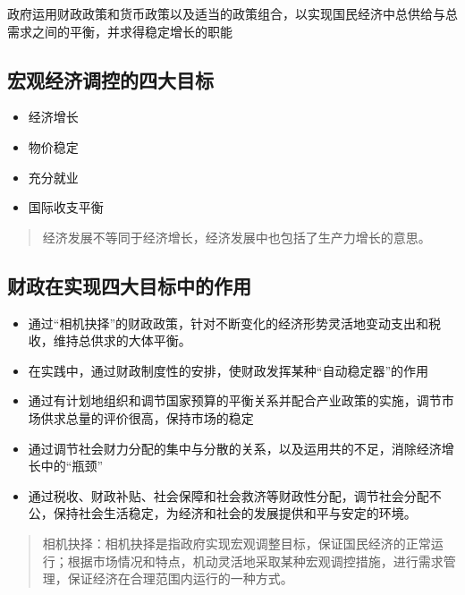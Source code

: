 \documentclass[
]{book}
\providecommand{\tightlist}{%
  \setlength{\itemsep}{0pt}\setlength{\parskip}{0pt}}
\theoremstyle{definition}
\theoremstyle{definition}
\theoremstyle{definition}
\theoremstyle{definition}
\theoremstyle{remark}
\begin{document}
政府运用财政政策和货币政策以及适当的政策组合，以实现国民经济中总供给与总需求之间的平衡，并求得稳定增长的职能

\hypertarget{ux5b8fux89c2ux7ecfux6d4eux8c03ux63a7ux7684ux56dbux5927ux76eeux6807}{%
\subsection{宏观经济调控的四大目标}\label{ux5b8fux89c2ux7ecfux6d4eux8c03ux63a7ux7684ux56dbux5927ux76eeux6807}}

\begin{itemize}
\tightlist
\item
  经济增长
\item
  物价稳定
\item
  充分就业
\item
  国际收支平衡
\end{itemize}

\begin{quote}
经济发展不等同于经济增长，经济发展中也包括了生产力增长的意思。
\end{quote}

\hypertarget{ux8d22ux653fux5728ux5b9eux73b0ux56dbux5927ux76eeux6807ux4e2dux7684ux4f5cux7528}{%
\subsection{财政在实现四大目标中的作用}\label{ux8d22ux653fux5728ux5b9eux73b0ux56dbux5927ux76eeux6807ux4e2dux7684ux4f5cux7528}}

\begin{itemize}
\tightlist
\item
  通过``相机抉择''的财政政策，针对不断变化的经济形势灵活地变动支出和税收，维持总供求的大体平衡。
\item
  在实践中，通过财政制度性的安排，使财政发挥某种``自动稳定器''的作用
\item
  通过有计划地组织和调节国家预算的平衡关系并配合产业政策的实施，调节市场供求总量的评价很高，保持市场的稳定
\item
  通过调节社会财力分配的集中与分散的关系，以及运用共的不足，消除经济增长中的``瓶颈''
\item
  通过税收、财政补贴、社会保障和社会救济等财政性分配，调节社会分配不公，保持社会生活稳定，为经济和社会的发展提供和平与安定的环境。
\end{itemize}

\begin{quote}
相机抉择：相机抉择是指政府实现宏观调整目标，保证国民经济的正常运行；根据市场情况和特点，机动灵活地采取某种宏观调控措施，进行需求管理，保证经济在合理范围内运行的一种方式。
\end{quote}
\end{document}
